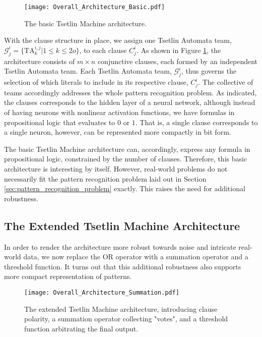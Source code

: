 \documentclass[11pt,a4paper]{article}
\newcommand{\True}{\mbox{1}}
\newcommand{\False}{\mbox{0}}
\begin{document}
\begin{figure}[!t]
\centering
\texttt{[image: Overall\_Architecture\_Basic.pdf]}
\caption{The basic Tsetlin Machine architecture.}
\label{figure:architecture_basic}
\end{figure}

With the clause structure in place, we assign one Tsetlin Automata team,  $\mathcal{G}^i_j = \{\mathrm{TA}_k^{i,j} | 1 \le k \le 2o\}$, to each clause $C^i_j$. As shown in Figure \ref{figure:architecture_basic}, the architecture consists of $m \times n$ conjunctive clauses, each formed by an independent Tsetlin Automata team. Each Tsetlin Automata team, $\mathcal{G}^i_j$, thus governs the selection of which literals to include in its respective clause, $C^i_j$. The collective of teams accordingly addresses the whole pattern recognition problem. As indicated, the clauses corresponds to the hidden layer of a neural network, although instead of having neurons with nonlinear activation functions, we have formulas in propositional logic that evaluates to $\False$ or $\True$. That is, a single clause corresponds to a single neuron, however, can be represented more compactly in bit form.  

The basic Tsetlin Machine architecture can, accordingly, express any formula in propositional logic, constrained by the number of clauses. Therefore, this basic architecture is interesting by itself. However, real-world problems do not necessarily fit the pattern recognition problem laid out in Section \ref{sec:pattern_recognition_problem} exactly. This raises the need for additional robustness.

\subsection{The Extended Tsetlin Machine Architecture}

In order to render the architecture more robust towards noise and intricate real-world data, we now replace the OR operator with a summation operator and a threshold function. It turns out that this additional robustness also supports more compact representation of patterns.

\begin{figure}[!t]
\centering
\texttt{[image: Overall\_Architecture\_Summation.pdf]}
\caption{The extended Tsetlin Machine architecture, introducing clause polarity, a summation operator collecting "votes", and a threshold function arbitrating the final output.}
\label{figure:architecture_summation}
\end{figure}
\end{document}
